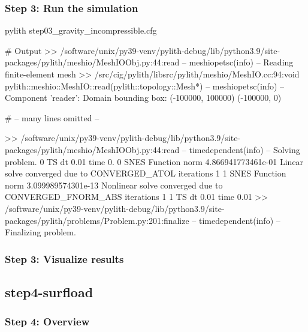\documentclass[aspectratio=169]{beamer}
\begin{document}
\begin{frame}[fragile]
  \frametitle{Step 3: Run the simulation}
  \summary{}

\begin{bashcode}
pylith step03_gravity_incompressible.cfg

# Output
 >> /software/unix/py39-venv/pylith-debug/lib/python3.9/site-packages/pylith/meshio/MeshIOObj.py:44:read
 -- meshiopetsc(info)
 -- Reading finite-element mesh
 >> /src/cig/pylith/libsrc/pylith/meshio/MeshIO.cc:94:void pylith::meshio::MeshIO::read(pylith::topology::Mesh*)
 -- meshiopetsc(info)
 -- Component 'reader': Domain bounding box:
    (-100000, 100000)
    (-100000, 0)

# -- many lines omitted --

 >> /software/unix/py39-venv/pylith-debug/lib/python3.9/site-packages/pylith/meshio/MeshIOObj.py:44:read
 -- timedependent(info)
 -- Solving problem.
0 TS dt 0.01 time 0.
    0 SNES Function norm 4.866941773461e-01
    Linear solve converged due to CONVERGED_ATOL iterations 1
    1 SNES Function norm 3.099989574301e-13
  Nonlinear solve converged due to CONVERGED_FNORM_ABS iterations 1
1 TS dt 0.01 time 0.01
 >> /software/unix/py39-venv/pylith-debug/lib/python3.9/site-packages/pylith/problems/Problem.py:201:finalize
 -- timedependent(info)
 -- Finalizing problem.
\end{bashcode}
  
\end{frame}


\begin{frame}
  \frametitle{Step 3: Visualize results}

    
\end{frame}


\subsection{step4-surfload}

\begin{frame}
  \frametitle{Step 4: Overview}

      
\end{frame}
\end{document}

